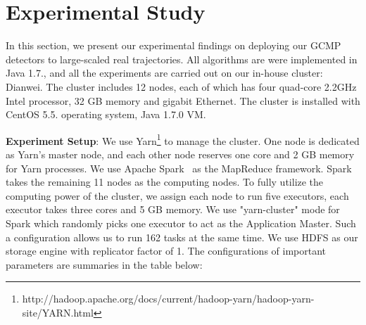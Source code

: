 \section{Experimental Study}
\label{sec:exp}
In this section, we present our experimental findings on
deploying our GCMP detectors to large-scaled real trajectories.
All algorithms are were implemented in Java 1.7., and all the 
experiments are carried out on our in-house cluster: Dianwei. The cluster
includes 12 nodes, each of which has four quad-core 2.2GHz Intel processor,
32 GB memory and gigabit Ethernet. The cluster is installed with CentOS 5.5. 
operating system, Java 1.7.0 VM.

\textbf{Experiment Setup}: We use Yarn\footnote{http://hadoop.apache.org/docs/current/hadoop-yarn/hadoop-yarn-site/YARN.html}
to manage the cluster. One node is dedicated as Yarn's master node, and each other node reserves one core and 2 GB memory for
Yarn processes. We use Apache Spark~\cite{zaharia2012resilient} as the MapReduce framework. Spark takes
the remaining 11 nodes as the computing nodes.
To fully utilize the computing power of the cluster, 
we assign each node to run five executors, each executor takes three cores and 5 GB memory. We use "yarn-cluster" mode
for Spark which randomly picks one executor to act as the Application Master. Such a configuration allows us to run 162 tasks
at the same time. We use HDFS as our storage engine with replicator factor of 1.
The configurations of important parameters are summaries in the table below:



